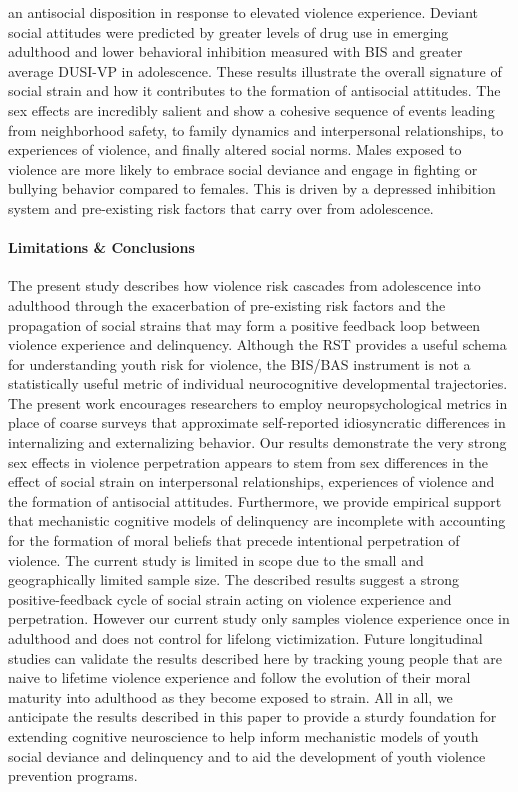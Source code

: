 \documentclass[utf8]{article}
\begin{document}
an antisocial disposition in response to elevated violence experience. Deviant social attitudes were predicted by greater levels of drug use in emerging adulthood and lower behavioral inhibition measured with BIS and greater average DUSI-VP in adolescence. These results illustrate the overall signature of social strain and how it contributes to the formation of antisocial attitudes. The sex effects are incredibly salient and show a cohesive sequence of events leading from neighborhood safety, to family dynamics and interpersonal relationships, to experiences of violence, and finally altered social norms. Males exposed to violence are more likely to embrace social deviance and engage in fighting or bullying behavior compared to females. This is driven by a depressed inhibition system and pre-existing risk factors that carry over from adolescence.
\paragraph{Limitations \& Conclusions} The present study describes how violence risk cascades from adolescence into adulthood through the exacerbation of pre-existing risk factors  and the propagation of social strains that may form a positive feedback loop between violence experience and delinquency. Although the RST provides a useful schema for understanding youth risk for violence, the BIS/BAS instrument is not a statistically useful metric of individual neurocognitive developmental trajectories. The present work encourages researchers to employ neuropsychological metrics in place of coarse surveys that approximate self-reported idiosyncratic differences in internalizing and externalizing behavior. Our results demonstrate the very strong sex effects in violence perpetration appears to stem from sex differences in the effect of social strain on interpersonal relationships, experiences of violence and the formation of antisocial attitudes. Furthermore, we provide empirical support that mechanistic cognitive models of delinquency are incomplete with accounting for the formation of moral beliefs that precede intentional perpetration of violence. The current study is limited in scope due to the small and geographically limited sample size. The described results suggest a strong positive-feedback cycle of social strain acting on violence experience and perpetration. However our current study only samples violence experience once in adulthood and does not control for lifelong victimization. Future longitudinal studies can validate the results described here by tracking young people that are naive to lifetime violence experience and follow the evolution of their moral maturity into adulthood as they become exposed to strain. All in all, we anticipate the results described in this paper to provide a sturdy foundation for extending cognitive neuroscience to help inform mechanistic models of youth social deviance and delinquency and to aid the development of youth violence prevention programs.
\end{document}
